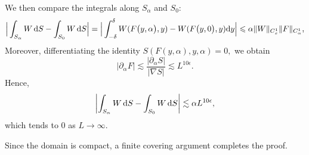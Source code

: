 \documentclass[UTF-8,reqno]{amsart}
\numberwithin{equation}{section}
\theoremstyle{definition}
\def\dif{{\mathord{{\rm d}}}}
\def\geq{\geqslant}
\def\leq{\leqslant}
\def\dif{{\mathord{{\rm d}}}}
\def\geq{\geqslant}
\def\leq{\leqslant}
\begin{document}
 We then compare the integrals along $S_\alpha$ and $S_0$:
\[
\Big|\int_{S_\alpha} W\,\dif S - \int_{S_0} W\,\dif S\Big| =\Big|\int_{-\delta}^\delta W(F\big(y,\alpha\big),y)-W(F\big(y,0\big),y)\dif y\Big|\leq \alpha \|W\|_{C^1_{x}}\|F\|_{C_\alpha^1},
\]
Moreover, differentiating the identity $S(F(y,\alpha),y,\alpha)=0,$
we obtain
\[
|\partial_\alpha F|
\lesssim
\frac{|\partial_\alpha S|}{|\nabla S|}
\lesssim L^{10\epsilon}.
\]
Hence,
\[
\left|
\int_{S_\alpha} W\,\dif S
-
\int_{S_0} W\,\dif S
\right|
\lesssim \alpha L^{10\epsilon},
\]
which tends to $0$ as $L\to\infty$.

Since the domain is compact, a finite covering argument completes the proof.


\end{document}
